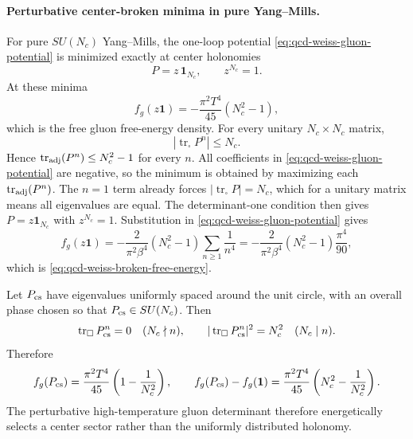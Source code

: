 \paragraph{Perturbative center-broken minima in pure Yang--Mills.}
For pure \(SU(N_c)\) Yang--Mills, the one-loop potential
\eqref{eq:qcd-weiss-gluon-potential} is minimized exactly at center
holonomies
\begin{equation}
  P=z\,\mathbf1_{N_c},
  \qquad
  z^{N_c}=1 .
  \label{eq:qcd-weiss-center-minima}
\end{equation}
At these minima
\begin{equation}
f_g(z\mathbf1)
  =
  -\frac{\pi^2T^4}{45}(N_c^2-1),
  \label{eq:qcd-weiss-broken-free-energy}
\end{equation}
which is the free gluon free-energy density.
For every unitary \(N_c\times N_c\) matrix,
\[
  |\operatorname{tr}_{\square}P^n|\le N_c .
\]
Hence \(\operatorname{tr}_{\rm adj}(P^n)\le N_c^2-1\) for every \(n\).  All
coefficients in \eqref{eq:qcd-weiss-gluon-potential} are negative, so the
minimum is obtained by maximizing each
\(\operatorname{tr}_{\rm adj}(P^n)\).  The \(n=1\) term already forces
\(|\operatorname{tr}_{\square}P|=N_c\), which for a unitary matrix means all
eigenvalues are equal.  The determinant-one condition then gives
\(P=z\mathbf1_{N_c}\) with \(z^{N_c}=1\).  Substitution in
\eqref{eq:qcd-weiss-gluon-potential} gives
\[
  f_g(z\mathbf1)
  =
  -\frac{2}{\pi^2\beta^4}(N_c^2-1)
  \sum_{n\ge1}\frac1{n^4}
  =
  -\frac{2}{\pi^2\beta^4}(N_c^2-1)\frac{\pi^4}{90},
\]
which is \eqref{eq:qcd-weiss-broken-free-energy}.

\begin{example}
\label{ex:qcd-weiss-center-symmetric-holonomy}
Let \(P_{\rm cs}\) have eigenvalues uniformly spaced around the unit circle,
with an overall phase chosen so that \(P_{\rm cs}\in SU(N_c)\).  Then
\[
  \operatorname{tr}_{\square}P_{\rm cs}^n=0
  \quad(N_c\nmid n),
  \qquad
  |\operatorname{tr}_{\square}P_{\rm cs}^n|^2=N_c^2
  \quad(N_c\mid n).
\]
Therefore
\begin{equation}
  f_g(P_{\rm cs})
  =
  \frac{\pi^2T^4}{45}\left(1-\frac1{N_c^2}\right),
  \qquad
  f_g(P_{\rm cs})-f_g(\mathbf1)
  =
  \frac{\pi^2T^4}{45}\left(N_c^2-\frac1{N_c^2}\right).
  \label{eq:qcd-weiss-center-symmetric-cost}
\end{equation}
The perturbative high-temperature gluon determinant therefore energetically
selects a center sector rather than the uniformly distributed holonomy.
\end{example}

